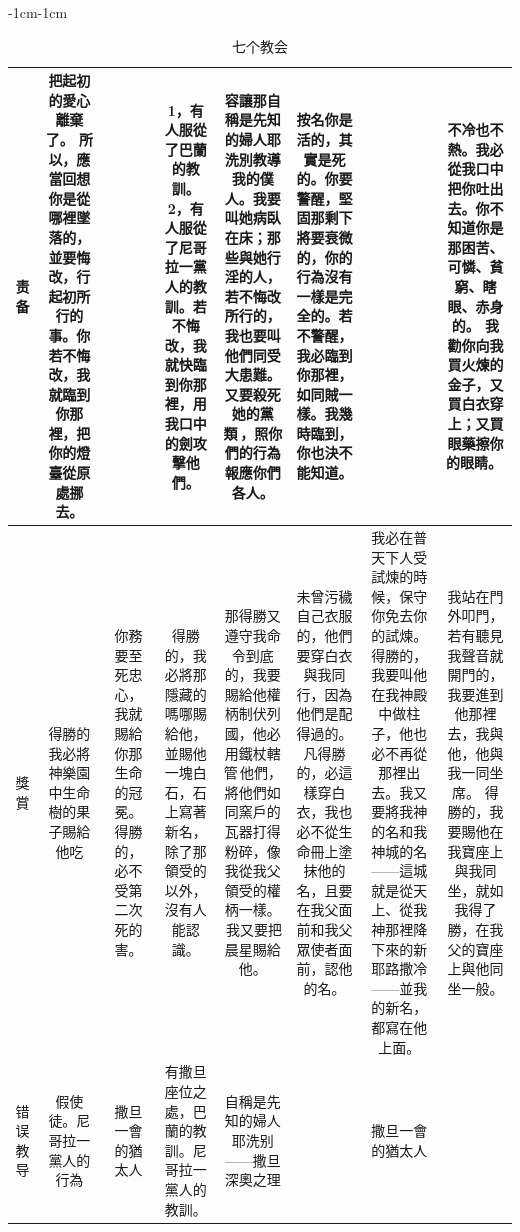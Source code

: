 \begin{changemargin}{-1cm}{-1cm}
\begin{table}
\begin{tabular}{cccccccc}
\multicolumn{1}{m{.3cm}|}{责备}&
\multicolumn{1}{m{3cm}|}{把起初的愛心離棄了。 所以，應當回想你是從哪裡墜落的，並要悔改，行起初所行的事。你若不悔改，我就臨到你那裡，把你的燈臺從原處挪去。 }  &
\multicolumn{1}{m{3cm}|}{}  &
 \multicolumn{1}{m{3cm}|}{1，有人服從了巴蘭的教訓。2，有人服從了尼哥拉一黨人的教訓。若不悔改，我就快臨到你那裡，用我口中的劍攻擊他們。} &
 \multicolumn{1}{m{4cm}|}{容讓那自稱是先知的婦人耶洗別教導我的僕人。我要叫她病臥在床；那些與她行淫的人，若不悔改所行的，我也要叫他們同受大患難。又要殺死她的黨類 ，照你們的行為報應你們各人。}  &
 \multicolumn{1}{m{3cm}|}{按名你是活的，其實是死的。你要警醒，堅固那剩下將要衰微的，你的行為沒有一樣是完全的。若不警醒，我必臨到你那裡，如同賊一樣。我幾時臨到，你也決不能知道。}   &
 \multicolumn{1}{m{3.6cm}|}{}  &  
 \multicolumn{1}{m{3cm}|}{不冷也不熱。我必從我口中把你吐出去。你不知道你是那困苦、可憐、貧窮、瞎眼、赤身的。 我勸你向我買火煉的金子，又買白衣穿上；又買眼藥擦你的眼睛。 } \\\hline
 
 


\multicolumn{1}{m{.3cm}|}{獎賞}&
\multicolumn{1}{m{3cm}|}{得勝的我必將神樂園中生命樹的果子賜給他吃}  &
 \multicolumn{1}{m{3cm}|}{你務要至死忠心，我就賜給你那生命的冠冕。得勝的，必不受第二次死的害。} &
 \multicolumn{1}{m{3cm}|}{得勝的，我必將那隱藏的嗎哪賜給他，並賜他一塊白石，石上寫著新名，除了那領受的以外，沒有人能認識。 } & 
  \multicolumn{1}{m{4cm}|}{那得勝又遵守我命令到底的，我要賜給他權柄制伏列國，他必用鐵杖轄管 他們，將他們如同窯戶的瓦器打得粉碎，像我從我父領受的權柄一樣。  我又要把晨星賜給他。 }& 
   \multicolumn{1}{m{3cm}|}{未曾污穢自己衣服的，他們要穿白衣與我同行，因為他們是配得過的。 凡得勝的，必這樣穿白衣，我也必不從生命冊上塗抹他的名，且要在我父面前和我父眾使者面前，認他的名。 } & 
    \multicolumn{1}{m{3.6cm}|}{我必在普天下人受試煉的時候，保守你免去你的試煉。得勝的，我要叫他在我神殿中做柱子，他也必不再從那裡出去。我又要將我神的名和我神城的名——這城就是從天上、從我神那裡降下來的新耶路撒冷——並我的新名，都寫在他上面。 } &
     \multicolumn{1}{m{3cm}|}{我站在門外叩門，若有聽見我聲音就開門的，我要進到他那裡去，我與他，他與我一同坐席。 得勝的，我要賜他在我寶座上與我同坐，就如我得了勝，在我父的寶座上與他同坐一般。} \\\hline
     
  \multicolumn{1}{m{.3cm}|}{错误教导}&
\multicolumn{1}{m{3cm}|}{假使徒。尼哥拉一黨人的行為}  &
\multicolumn{1}{m{3cm}|}{撒旦一會的猶太人}  &
 \multicolumn{1}{m{3cm}|}{有撒旦座位之處，巴蘭的教訓。尼哥拉一黨人的教訓。} &
 \multicolumn{1}{m{4cm}|}{自稱是先知的婦人耶洗别——撒旦深奧之理}  &
 \multicolumn{1}{m{3cm}|}{}   &
 \multicolumn{1}{m{3.6cm}|}{撒旦一會的猶太人}  &  
 \multicolumn{1}{m{3cm}|}{ } \\\hline
    
     
\end{tabular}
\caption{七个教会}
\end{table} 
\end{changemargin}

